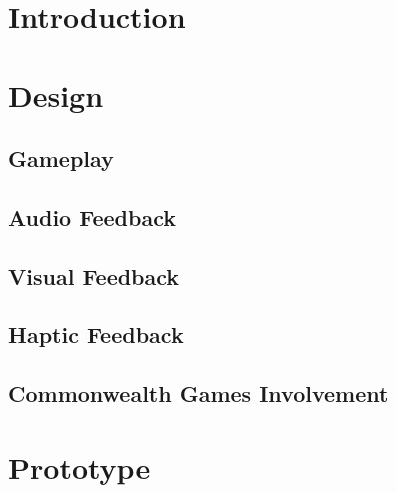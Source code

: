 \usepackage{tabularx}
\usepackage{url}
\usepackage{graphicx}

\title{}
\author{Dan McElroy}
\date{27 November 2013}



\maketitle

\begin{abstract}

\end{abstract}


\section{Introduction}


\section{Design}

\subsection{Gameplay}

\subsection{Audio Feedback}

\subsection{Visual Feedback}

\subsection{Haptic Feedback}

\subsection{Commonwealth Games Involvement}


\section{Prototype}

